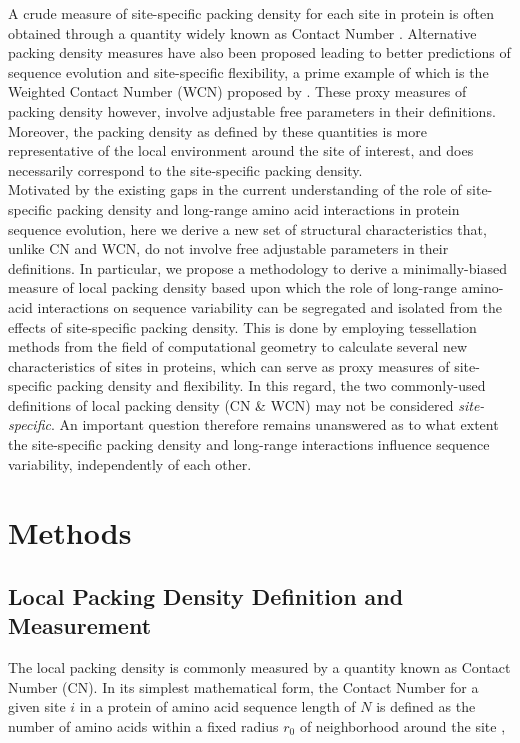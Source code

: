 \documentclass[11pt]{article}
\begin{document}
    A crude measure of site-specific packing density for each site in protein is often obtained through a quantity widely known as Contact Number \citep[e.g.,][]{liao_protein_2005}. Alternative packing density measures have also been proposed leading to better predictions of sequence evolution and site-specific flexibility, a prime example of which is the Weighted Contact Number (WCN) proposed by \citet{lin_deriving_2008}. These proxy measures of packing density however, involve adjustable free parameters in their definitions. Moreover, the packing density as defined by these quantities is more representative of the local environment around the site of interest, and does necessarily correspond to the site-specific packing density. \\

    Motivated by the existing gaps in the current understanding of the role of site-specific packing density and long-range amino acid interactions in protein sequence evolution, here we derive a new set of structural characteristics that, unlike CN and WCN, do not involve free adjustable parameters in their definitions. In particular, we propose a methodology to derive a minimally-biased measure of local packing density based upon which the role of long-range amino-acid interactions on sequence variability can be segregated and isolated from the effects of site-specific packing density.  This is done by employing tessellation methods from the field of computational geometry to calculate several new characteristics of sites in proteins, which can serve as proxy measures of site-specific packing density and flexibility. In this regard, the two commonly-used definitions of local packing density (CN \& WCN) may not be considered {\it site-specific}. An important question therefore remains unanswered as to what extent the site-specific packing density and long-range interactions influence sequence variability, independently of each other.  \\

\section{Methods}
\label{sec:methods}
    
    \subsection*{Local Packing Density Definition and Measurement}
    
    The local packing density is commonly measured by a quantity known as Contact Number (CN). In its simplest mathematical form, the Contact Number for a given site $i$ in a protein of amino acid sequence length of $N$ is defined as the number of amino acids within a fixed radius $r_0$ of neighborhood around the site \citep[e.g.,][]{franzosa_structural_2009},
\end{document}
